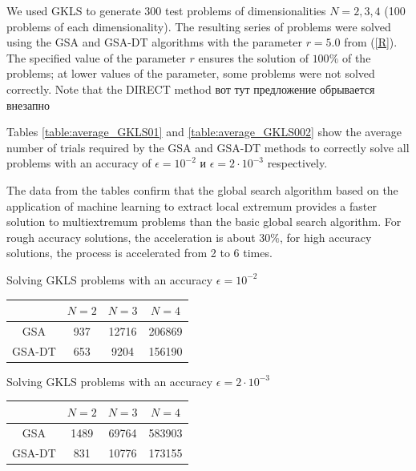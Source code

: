 \documentclass[entropy,article,submit,moreauthors,pdftex]{Definitions/mdpi}
\begin{document}
We used GKLS to generate 300 test problems of dimensionalities $N=2,3,4$ (100 problems of each dimensionality).
The resulting series of problems were solved using the GSA and GSA-DT algorithms with the parameter $r=5.0$ from (\ref{R}). The specified value of the parameter $r$ ensures the solution of  $100\%$ of the problems; at lower values of the parameter, some problems were not solved correctly. Note that the DIRECT method вот тут предложение обрывается внезапно

Tables \ref{table:average_GKLS01} and \ref{table:average_GKLS002} show the average number of trials required by the GSA and GSA-DT methods to correctly solve all problems with an accuracy of $\epsilon = 10^{-2}$ и $\epsilon = 2 \cdot 10^{-3}$ respectively.

The data from the tables confirm that the global search algorithm based on the application of machine learning to extract local extremum provides a faster solution to multiextremum problems than the basic global search algorithm. For rough accuracy solutions, the acceleration is about  $30\%$, for high accuracy solutions, the process is accelerated from 2 to 6 times.

\begin{specialtable}[H] 
	\caption{Solving GKLS problems with an accuracy  $\epsilon = 10^{-2}$}\label{table:average_GKLS01}
	\center
\begin{tabular}{cccc}
\toprule
        & $N=2$ & $N=3$  & $N=4$    \\
\midrule
GSA     &  937  &  12716 &  206869  \\
GSA-DT  &  653  &  9204  &  156190  \\
\bottomrule
\end{tabular}
\end{specialtable}

\begin{specialtable}[H] 
	\caption{Solving GKLS problems with an accuracy $\epsilon = 2 \cdot 10^{-3}$}\label{table:average_GKLS002}
	\center
\begin{tabular}{cccc}
\toprule

       & $N=2$ & $N=3$  & $N=4$    \\
\midrule
GSA    & 1489  & 69764  & 583903  \\
GSA-DT & 831   & 10776  & 173155   \\
\bottomrule
\end{tabular}
\end{specialtable}
\end{document}
